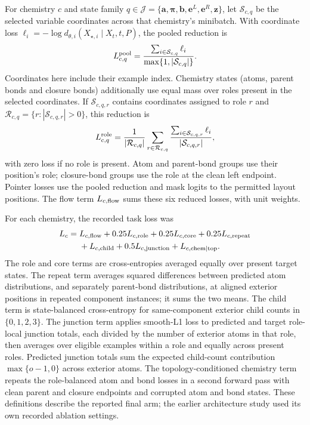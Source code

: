\documentclass{article}
\theoremstyle{definition}
\begin{document}
For chemistry $c$ and state family
$q\in\mathscr J=\{\mathbf a,\boldsymbol\pi,\mathbf b,\mathbf e^L,\mathbf e^R,\mathbf z\}$,
let $\mathcal S_{c,q}$ be the selected variable coordinates across that chemistry's minibatch.
With coordinate loss $\ell_i=-\log d_{\theta,i}(X_{\star,i}\mid X_t,t,P)$, the pooled reduction is
\begin{equation}
 L_{c,q}^{\rm pool}=\frac{\sum_{i\in\mathcal S_{c,q}}\ell_i}{\max\{1,|\mathcal S_{c,q}|\}}.
\end{equation}
Coordinates here include their example index. Chemistry states (atoms, parent bonds and closure
bonds) additionally use equal mass over roles present in the selected coordinates. If
$\mathcal S_{c,q,r}$ contains coordinates assigned to role $r$ and
$\mathcal R_{c,q}=\{r:|\mathcal S_{c,q,r}|>0\}$, this reduction is
\begin{equation}
 L_{c,q}^{\rm role}=\frac{1}{|\mathcal R_{c,q}|}
 \sum_{r\in\mathcal R_{c,q}}\frac{\sum_{i\in\mathcal S_{c,q,r}}\ell_i}{|\mathcal S_{c,q,r}|},
 \label{eq:role-balanced-loss}
\end{equation}
with zero loss if no role is present. Atom and parent-bond groups use their position's role;
closure-bond groups use the role at the clean left endpoint. Pointer losses use the pooled reduction
and mask logits to the permitted layout positions. The flow term $L_{c,\rm flow}$ sums these six
reduced losses, with unit weights.

For each chemistry, the recorded task loss was
\begin{equation}
\begin{aligned}
 L_c={}&L_{c,\rm flow}
 +0.25L_{c,\rm role}+0.25L_{c,\rm core}+0.25L_{c,\rm repeat}\\
 &+L_{c,\rm child}+0.5L_{c,\rm junction}+L_{c,\rm chem\mid top}.
\end{aligned}
\label{eq:production-task-loss}
\end{equation}
The role and core terms are cross-entropies averaged equally over present target states.
The repeat term averages squared differences between predicted atom distributions, and separately
parent-bond distributions, at aligned exterior positions in repeated component instances; it sums
the two means. The child term is state-balanced cross-entropy for same-component exterior child
counts in $\{0,1,2,3\}$. The junction term applies smooth-L1 loss to predicted and target
role-local junction totals, each divided by the number of exterior atoms in that role, then averages
over eligible examples within a role and equally across present roles. Predicted junction totals
sum the expected child-count contribution $\max\{o-1,0\}$ across exterior atoms.
The topology-conditioned chemistry term repeats the role-balanced atom and bond losses in a second
forward pass with clean parent and closure endpoints and corrupted atom and bond states.
These definitions describe the reported final arm; the earlier architecture study used its own
recorded ablation settings.
\end{document}
